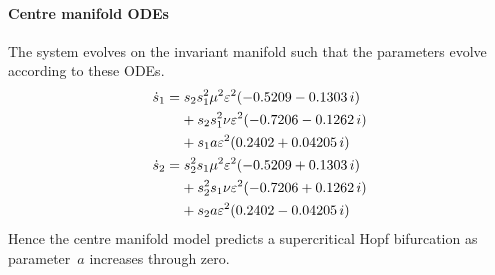 \paragraph{Centre manifold ODEs} 
The system evolves on the invariant manifold such
that the parameters evolve according to these ODEs.
\begin{align*}&
\dot s_{1}=s_{2} s_{1}^{2} \mu ^{2} \varepsilon^{2} ( - 0.5209 - 0.1303\,i)
\\&\qquad{}
+s_{2} s_{1}^{2} \nu  \varepsilon^{2} ( - 0.7206 - 0.1262\,i)
\\&\qquad{}
+s_{1} a \varepsilon^{2} (0.2402 + 0.04205\,i)
\\&
\dot s_{2}=s_{2}^{2} s_{1} \mu ^{2} \varepsilon^{2} ( - 0.5209 + 0.1303\,i)
\\&\qquad{}
+s_{2}^{2} s_{1} \nu  \varepsilon^{2} ( - 0.7206 + 0.1262\,i)
\\&\qquad{}
+s_{2} a \varepsilon^{2} (0.2402 - 0.04205\,i)
\end{align*}
Hence the centre manifold model predicts a supercritical Hopf bifurcation as parameter~\(a\) increases through zero.

